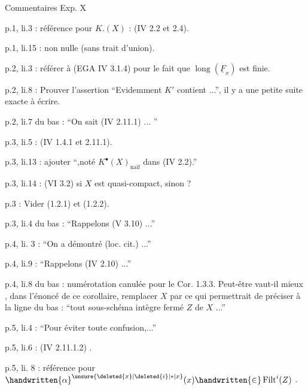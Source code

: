 \begin{center}Commentaires Exp. X\end{center}

p.1, li.3 : référence pour $K.(X)$ : (IV 2.2 et 2.4).

p.1, li.15 : non nulle (sans trait d'union).

p.2, li.3 : référer à (EGA IV 3.1.4) pour le fait que $\operatorname{long}(\underline{F}_x)$ est finie.

p.2, li.8 : Prouver l'assertion ``Evidemment $K'$ contient ...'', il y a une petite suite exacte à écrire.

p.2, li.7 du bas : ``On sait (IV 2.11.1) ... ''

p.3, li.5 : (IV 1.4.1 et 2.11.1).


p.3, li.13 :  ajouter ``,noté $K^{\bullet}(X)_{\text{naïf}}$ dans (IV 2.2).''

p.3, li.14 :  (VI 3.2) si $X$ est quasi-compact, sinon ?

p.3 : Vider (1.2.1) et (1.2.2).

p.3, li.4 du bas : ``Rappelons (V 3.10) ...''

p.4, li. 3 : ``On a démontré (loc. cit.) ...''

p.4, li.9 : ``Rappelons (IV 2.10) ...''

p.4, li.8 du bas : numérotation canulée pour le Cor. 1.3.3. Peut-être vaut-il mieux , dans l'énoncé de ce corollaire, remplacer $X$ par  ce qui permettrait de préciser à la ligne du bas : ``tout sous-schéma intègre fermé $Z$ de $X$ ...''

p.5, li.4 : ``Pour  éviter toute confusion,...''

p.5, li.6 : (IV 2.11.1.2) .

p.5, li. 8 : référence  pour $\handwritten{\alpha}^{\unsure{\deleted{x}|\deleted{i}|*|x}}(x)\handwritten{\in}\operatorname{Filt}^{i}(Z)$ .


